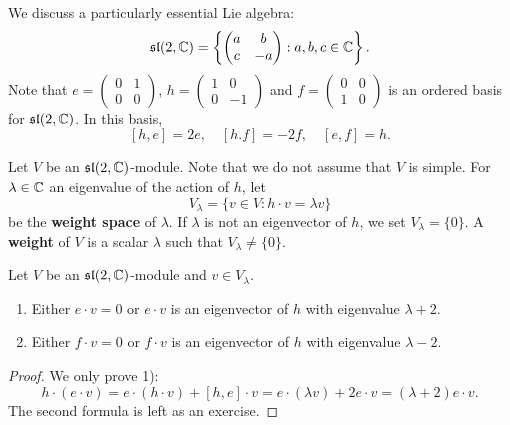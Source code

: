 \chapter{}


We discuss a particularly essential Lie algebra: 
\[
\mathfrak{sl}(2,\mathbb{C})=\left\{\begin{pmatrix}
    a & b\\
    c & -a
    \end{pmatrix}:a,b,c\in\mathbb{C}\right\}.
\]
Note that 
$e=\begin{pmatrix}
        0&1\\
        0&0\end{pmatrix}$, $h=\begin{pmatrix}
        1&0\\
        0&-1\end{pmatrix}$ and $f=\begin{pmatrix}0&0\\1&0\end{pmatrix}$ 
        is an ordered basis for $\mathfrak{sl}(2,\mathbb{C})$. In this basis,
\[
[h,e]=2e,\quad
[h.f]=-2f,\quad
[e,f]=h.
\]

Let $V$ be an $\mathfrak{sl}(2,\mathbb{C})$-module. Note that we do not assume that $V$ is simple. 
For $\lambda\in\mathbb{C}$ an eigenvalue of the action of $h$, let
\[
V_{\lambda}=\{v\in V:h\cdot v=\lambda v\}
\]
be the \textbf{weight space} of $\lambda$. 
If $\lambda$ is not an eigenvector of $h$, 
we set $V_{\lambda}=\{0\}$. A \textbf{weight} of $V$  
is a scalar $\lambda$ such that $V_{\lambda}\ne\{0\}$. 

\begin{lemma}
    Let $V$ be an $\mathfrak{sl}(2,\mathbb{C})$-module and $v\in V_{\lambda}$. 
    \begin{enumerate}
        \item Either $e\cdot v=0$ or $e\cdot v$ is an eigenvector of $h$ with
            eigenvalue $\lambda+2$.
        \item Either $f\cdot v=0$ or $f\cdot v$ is an eigenvector of $h$ with
            eigenvalue $\lambda-2$.
    \end{enumerate} 
\end{lemma}

\begin{proof}
    We only prove 1):
    \[h\cdot(e\cdot v)=e\cdot(h\cdot v)+[h,e]\cdot v=e\cdot(\lambda v)+2e\cdot v=(\lambda+2)e\cdot v.
    \]
    The second formula is left as an exercise. 
\end{proof}

